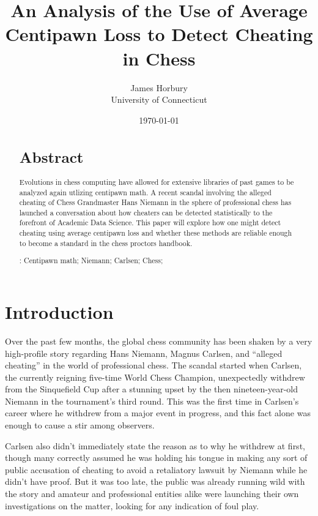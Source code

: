 \documentclass[12pt, letterpaper, titlepage]{article}
\title{An Analysis of the Use of Average Centipawn Loss to Detect Cheating in Chess}
\author{James Horbury\\
    University of Connecticut
}
\date{\today}
\begin{document}
\maketitle

\begin{abstract}
\section*{Abstract}
\label{sec:abs}

Evolutions in chess computing have allowed for extensive libraries of past games to be analyzed again utlizing centipawn math. A recent scandal involving the alleged cheating of Chess Grandmaster Hans Niemann in the sphere of professional chess has launched a conversation about how cheaters can be detected statistically to the forefront of Academic Data Science. This paper will explore how one might detect cheating using average centipawn loss and whether these methods are reliable enough to become a standard in the chess proctors handbook.

\bigskip
\noindent{}:
Centipawn math; 
Niemann;
Carlsen;
Chess;
\end{abstract}

\section*{Introduction}
\label{sec:intro}

Over the past few months, the global chess community has been shaken by a very high-profile story regarding Hans Niemann, Magnus Carlsen,  and “alleged cheating” in the world of professional chess. The scandal started when Carlsen, the currently reigning five-time World Chess Champion, unexpectedly withdrew from the Sinquefield Cup after a stunning upset by the then nineteen-year-old Niemann in the tournament's third round. This was the first time in Carlsen's career where he withdrew from a major event in progress, and this fact alone was enough to cause a stir among observers.

Carlsen also didn't immediately state the reason as to why he withdrew at first, though many correctly assumed he was holding his tongue in making any sort of public accusation of cheating to avoid a retaliatory lawsuit by Niemann while he didn't have proof. But it was too late, the public was already running wild with the story and amateur and professional entities alike were launching their own investigations on the matter, looking for any indication of foul play.
\end{document}
